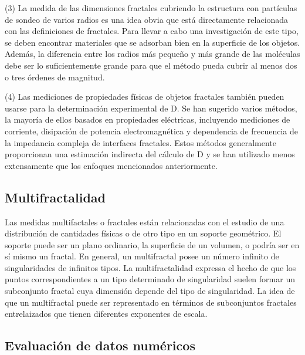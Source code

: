\documentclass[11pt]{article}
\begin{document}
(3) La medida de las dimensiones fractales cubriendo la estructura con partículas de sondeo de varios radios es una idea obvia que está directamente relacionada con las definiciones de fractales. Para llevar a cabo una investigación de este tipo, se deben encontrar materiales que se adsorban bien en la superficie de los objetos. Además, la diferencia entre los radios más pequeño y más grande de las moléculas debe ser lo suficientemente grande para que el método pueda cubrir al menos dos o tres órdenes de magnitud.


(4) Las mediciones de propiedades físicas de objetos fractales también pueden usarse para la determinación experimental de D. Se han sugerido varios métodos, la mayoría de ellos basados en propiedades eléctricas, incluyendo mediciones de corriente, disipación de potencia electromagnética y dependencia de frecuencia de la impedancia compleja de interfaces fractales. Estos métodos generalmente proporcionan una estimación indirecta del cálculo de D y se han utilizado menos extensamente que los enfoques mencionados anteriormente.


\subsection{Multifractalidad}

Las medidas multifactales o fractales están relacionadas con el estudio de una distribución de cantidades físicas o de otro tipo en un soporte geométrico. El soporte puede ser un plano ordinario, la superficie de un volumen, o podría ser en sí mismo un fractal. En general, un multifractal posee un número infinito de singularidades de infinitos tipos. La multifractalidad expressa el hecho de que los puntos correspondientes a un tipo determinado de singularidad suelen formar un subconjunto fractal cuya dimensión depende del tipo de singularidad. La idea de que un multifractal puede ser representado en términos de subconjuntos fractales entrelaizados que tienen diferentes exponentes de escala.

\subsection{Evaluación de datos numéricos}
\end{document}
